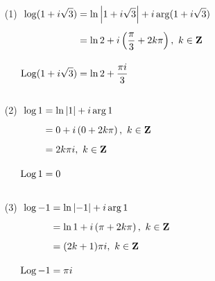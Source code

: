 \begin{example}\label{logcalc}
{}\hfill
\begin{itemize}[itemsep=1.5em]
\item[(1)] $\begin{aligned}[t]
\log(1 + i\sqrt{3}) &= \ln\left\lvert1 + i\sqrt{3}\right\rvert + i\arg(1 + i\sqrt{3})\\[0.5em]
&= \ln 2 + i\left(\dfrac{\pi}{3} + 2k\pi\right),\ k \in \mathbf Z\\[1em]
\operatorname{Log}(1 + i\sqrt{3}) &= \ln 2 + \dfrac{\pi i}{3}\\[1em]
\end{aligned}$
\end{itemize}

\begin{multicols}{2}
\begin{itemize}
\item[(2)] $\begin{aligned}[t]
\log 1 &= \ln\left\lvert1\right\rvert + i\arg 1\\[0.5em]
&= 0 + i\left(0 + 2k\pi\right),\ k \in \mathbf Z\\[0.5em]
&= 2k\pi i,\ k \in \mathbf Z\\[1em]
\operatorname{Log} 1 &= 0\\[1em]
\end{aligned}$

\item[(3)] $\begin{aligned}[t]
\log -1 &= \ln\left\lvert-1\right\rvert + i\arg 1\\[0.5em]
&= \ln 1 + i\left(\pi + 2k\pi\right),\ k \in \mathbf Z\\[0.5em]
&= (2k+1)\pi i,\ k \in \mathbf Z\\[1em]
\operatorname{Log} -1 &= \pi i\\[1em]
\end{aligned}$
\end{itemize}
\end{multicols}


\end{example}
